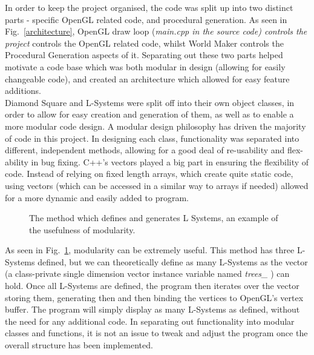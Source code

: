 \documentclass[a4paper,10pt]{report}
\begin{document}
In order to keep the project organised, the code was split up into two distinct parts - specific OpenGL related code, and procedural generation. As seen in Fig.~\ref{architecture}, OpenGL draw loop (\textit{main.cpp in the source code) controls the project} controls the OpenGL related code, whilst World Maker controls the Procedural Generation aspects of it. Separating out these two parts helped motivate a code base which was both modular in design (allowing for easily changeable code), and created an architecture which allowed for easy feature additions. \\

Diamond Square and L-Systems were split off into their own object classes, in order to allow for easy creation and generation of them, as well as to enable a more modular code design. A modular design philosophy has driven the majority of code in this project. In designing each class, functionality was separated into different, independent methods, allowing for a good deal of re-usability and flex-ability in bug fixing. C++'s vectors played a big part in ensuring the flexibility of code. Instead of relying on fixed length arrays, which create quite static code, using vectors (which can be accessed in a similar way to arrays if needed) allowed for a more dynamic and easily added to program. \\

\begin{figure}[h!]
\centering
 \caption{The method which defines and generates L Systems, an example of the usefulness of modularity.}
 \label{fig:tree_generation}
\end{figure}

As seen in Fig.~\ref{fig:tree_generation}, modularity can be extremely useful. This method has three L-Systems defined, but we can theoretically define as many L-Systems as the vector (a class-private single dimension vector instance variable named \textit{trees\_} ) can hold. Once all L-Systems are defined, the program then iterates over the vector storing them, generating then and then binding the vertices to OpenGL's vertex buffer. The program will simply display as many L-Systems as defined, without the need for any additional code. In separating out functionality into modular classes and functions, it is not an issue to tweak and adjust the program once the overall structure has been implemented.
\end{document}
